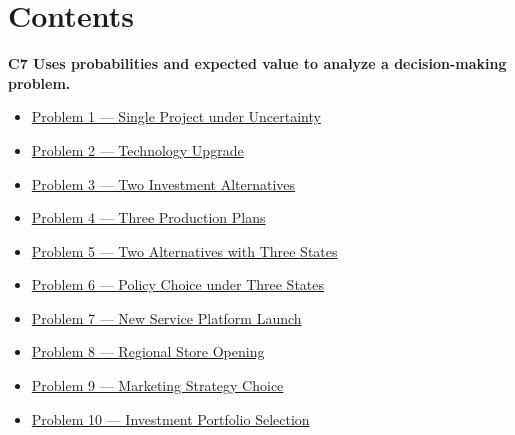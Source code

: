 


	
	\section*{Contents}
	\noindent\textbf{C7 Uses probabilities and expected value to analyze a decision-making problem.}
	\begin{itemize}
		\item \hyperlink{c7-ex1}{Problem 1 — Single Project under Uncertainty}
		\item \hyperlink{c7-ex2}{Problem 2 — Technology Upgrade}
		\item \hyperlink{c7-ex3}{Problem 3 — Two Investment Alternatives}
		\item \hyperlink{c7-ex4}{Problem 4 — Three Production Plans}
		\item \hyperlink{c7-ex5}{Problem 5 — Two Alternatives with Three States}
		\item \hyperlink{c7-ex6}{Problem 6 — Policy Choice under Three States}
		\item \hyperlink{c7-ex7}{Problem 7 — New Service Platform Launch}
		\item \hyperlink{c7-ex8}{Problem 8 — Regional Store Opening}
		\item \hyperlink{c7-ex9}{Problem 9 — Marketing Strategy Choice}
		\item \hyperlink{c7-ex10}{Problem 10 — Investment Portfolio Selection}
	\end{itemize}
	
	
